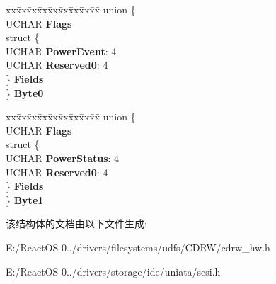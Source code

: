 \begin{DoxyCompactItemize}
\begin{tabbing}
\end{tabbing}\item 
\mbox{\label{struct___e_v_e_n_t___s_t_a_t___p_m___b_l_o_c_k_acaa75017df320e7316e82aaf81736653}} 
\begin{tabbing}
xx\=xx\=xx\=xx\=xx\=xx\=xx\=xx\=xx\=\kill
union \{\\
\>UCHAR {\bfseries Flags}\\
\>struct \{\\
\>\>UCHAR {\bfseries PowerEvent}: 4\\
\>\>UCHAR {\bfseries Reserved0}: 4\\
\>\} {\bfseries Fields}\\
\} {\bfseries Byte0}\\

\end{tabbing}\item 
\mbox{\label{struct___e_v_e_n_t___s_t_a_t___p_m___b_l_o_c_k_a5e338ff079b11411c7d278b0ad0cad39}} 
\begin{tabbing}
xx\=xx\=xx\=xx\=xx\=xx\=xx\=xx\=xx\=\kill
union \{\\
\>UCHAR {\bfseries Flags}\\
\>struct \{\\
\>\>UCHAR {\bfseries PowerStatus}: 4\\
\>\>UCHAR {\bfseries Reserved0}: 4\\
\>\} {\bfseries Fields}\\
\} {\bfseries Byte1}\\

\end{tabbing}\end{DoxyCompactItemize}


该结构体的文档由以下文件生成\+:\begin{DoxyCompactItemize}
\item 
E\+:/\+React\+O\+S-\/0../drivers/filesystems/udfs/\+C\+D\+R\+W/cdrw\+\_\+hw.\+h\item 
E\+:/\+React\+O\+S-\/0../drivers/storage/ide/uniata/scsi.\+h\end{DoxyCompactItemize}
